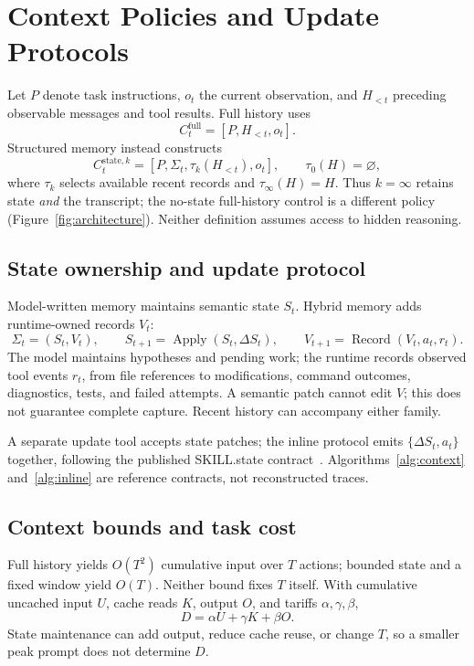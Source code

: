 \section{Context Policies and Update Protocols}
\label{sec:model}
Let $P$ denote task instructions, $o_t$ the current observation, and
$H_{<t}$ preceding observable messages and tool results. Full history uses
\begin{equation}
 C_t^{\mathrm{full}}=[P,H_{<t},o_t].
 \label{eq:ctx-transcript}
\end{equation}
Structured memory instead constructs
\begin{equation}
 C_t^{\mathrm{state},k}=[P,\Sigma_t,\tau_k(H_{<t}),o_t],
 \qquad \tau_0(H)=\varnothing,
 \label{eq:ctx-state}
\end{equation}
where $\tau_k$ selects available recent records and $\tau_\infty(H)=H$.
Thus $k=\infty$ retains state \emph{and} the transcript; the no-state
full-history control is a different policy (Figure~\ref{fig:architecture}).
Neither definition assumes access to hidden reasoning.


\subsection{State ownership and update protocol}
Model-written memory maintains semantic state $S_t$. Hybrid memory adds
runtime-owned records $V_t$:
\begin{equation}
 \Sigma_t=(S_t,V_t),\qquad
 S_{t+1}=\operatorname{Apply}(S_t,\Delta S_t),\qquad
 V_{t+1}=\operatorname{Record}(V_t,a_t,r_t).
 \label{eq:ownership}
\end{equation}
The model maintains hypotheses and pending work; the runtime records
observed tool events $r_t$, from file references to modifications, command
outcomes, diagnostics, tests, and failed attempts. A semantic patch cannot
edit $V$; this does not guarantee complete capture. Recent history can
accompany either family.

A separate update tool accepts state patches; the inline protocol emits
$\{\Delta S_t,a_t\}$ together, following the published SKILL.state
contract~\citep{skillstate2026}. Algorithms~\ref{alg:context}
and~\ref{alg:inline} are reference contracts, not reconstructed traces.


\subsection{Context bounds and task cost}
Full history yields $O(T^2)$ cumulative input over $T$ actions; bounded
state and a fixed window yield $O(T)$. Neither bound fixes $T$ itself.
With cumulative uncached input $U$, cache reads $K$, output $O$, and
tariffs $\alpha,\gamma,\beta$,
\begin{equation}
 D=\alpha U+\gamma K+\beta O.
 \label{eq:cost-model}
\end{equation}
State maintenance can add output, reduce cache reuse, or change $T$, so a
smaller peak prompt does not determine $D$.
